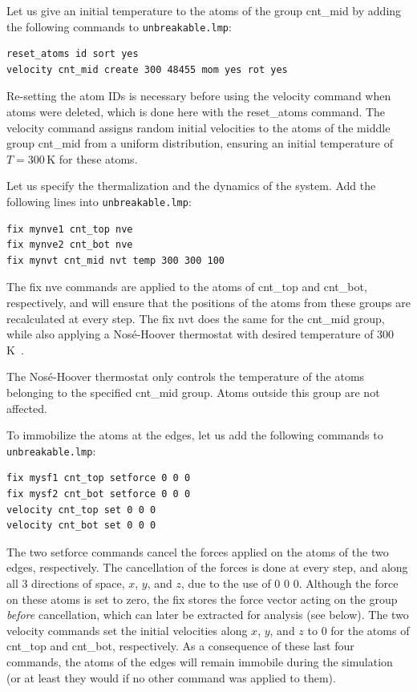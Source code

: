 \documentclass[9pt,tutorial]{livecoms}
\newcommand{\lmpcmd}[1]{\colorbox{listing}{\textcolor{command}{\small{#1}}}} %
\newcommand{\flecmd}[1]{\textcolor{command}{\texttt{#1}}} %
\begin{document}
Let us give an initial temperature to the atoms of the group \lmpcmd{cnt\_mid}
by adding the following commands to \flecmd{unbreakable.lmp}:
\begin{lstlisting}
reset_atoms id sort yes
velocity cnt_mid create 300 48455 mom yes rot yes
\end{lstlisting}
Re-setting the atom IDs is necessary before using the \lmpcmd{velocity} command
when atoms were deleted, which is done here with the \lmpcmd{reset\_atoms} command.
The \lmpcmd{velocity} command assigns random initial velocities to the atoms of the middle
group \lmpcmd{cnt\_mid} from a uniform distribution, ensuring an initial temperature of $T = 300\,\text{K}$
for these atoms.

Let us specify the thermalization and the dynamics of the system.  Add the following
lines into \flecmd{unbreakable.lmp}:
\begin{lstlisting}
fix mynve1 cnt_top nve
fix mynve2 cnt_bot nve
fix mynvt cnt_mid nvt temp 300 300 100
\end{lstlisting}
The \lmpcmd{fix nve} commands are applied to the atoms of \lmpcmd{cnt\_top} and
\lmpcmd{cnt\_bot}, respectively, and will ensure that the positions of the atoms
from these groups are recalculated at every step.  The \lmpcmd{fix nvt} does the
same for the \lmpcmd{cnt\_mid} group, while also applying a Nos\'e-Hoover thermostat
with desired temperature of 300\,K~\cite{nose1984unified, hoover1985canonical}.

\begin{note}
  The Nosé-Hoover thermostat only controls the temperature of
  the atoms belonging to the specified \lmpcmd{cnt\_mid} group. Atoms outside
  this group are not affected.
\end{note}

To immobilize the atoms at the edges, let us add the following
commands to \flecmd{unbreakable.lmp}:
\begin{lstlisting}
fix mysf1 cnt_top setforce 0 0 0
fix mysf2 cnt_bot setforce 0 0 0
velocity cnt_top set 0 0 0
velocity cnt_bot set 0 0 0
\end{lstlisting}
The two \lmpcmd{setforce} commands cancel the forces applied on the atoms of the
two edges, respectively.  The cancellation of the forces is done at every step,
and along all 3 directions of space, $x$, $y$, and $z$, due to the use of
\lmpcmd{0 0 0}.  Although the force on these atoms is set to zero,
the \lmpcmd{fix} stores the force vector acting on the group \emph{before}
cancellation, which can later be extracted for analysis (see below).
The two \lmpcmd{velocity} commands set the initial velocities
along $x$, $y$, and $z$ to 0 for the atoms of \lmpcmd{cnt\_top} and
\lmpcmd{cnt\_bot}, respectively.  As a consequence of these last four commands,
the atoms of the edges will remain immobile during the simulation (or at least
they would if no other command was applied to them).
\end{document}

